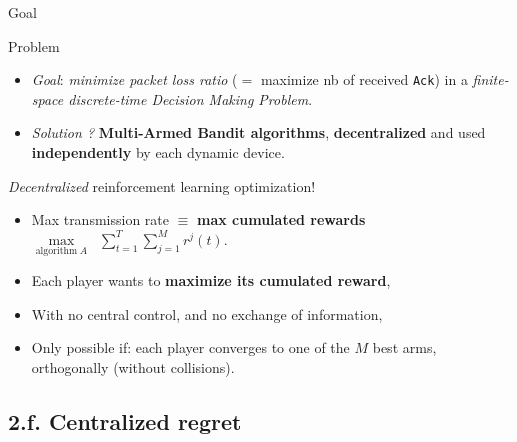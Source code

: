\documentclass[12pt,english,ignorenonframetext,aspectratio=169,]{beamer}
\providecommand{\tightlist}{%
  \setlength{\itemsep}{0pt}\setlength{\parskip}{0pt}}
\begin{document}
\begin{frame}[fragile]{Goal}

\begin{block}{Problem}

\begin{itemize}
\tightlist
\item
  \emph{Goal}: \emph{minimize packet loss ratio} (\(=\) maximize nb of
  received \texttt{Ack}) in a \emph{finite-space discrete-time Decision
  Making Problem}.
\item
  \emph{Solution ?} \textbf{Multi-Armed Bandit algorithms},
  \textbf{decentralized} and used \textbf{independently} by each dynamic
  device.
\end{itemize}

\end{block}

\begin{block}{\emph{Decentralized} reinforcement learning optimization!}

\begin{itemize}
\tightlist
\item
  Max transmission rate \(\equiv\) \textbf{max cumulated rewards}
  \(\max\limits_{\text{algorithm}\;A} \;\; \sum\limits_{t=1}^{T} \sum\limits_{j=1}^M r^j(t)\).
\item
  Each player wants to \textbf{maximize its cumulated reward},
\item
  With no central control, and no exchange of information,
\item
  Only possible if: each player converges to one of the \(M\) best
  arms, orthogonally (without collisions).
\end{itemize}

\end{block}

\end{frame}



\subsection{\hfill{}2.f. Centralized regret\hfill{}}
\end{document}
